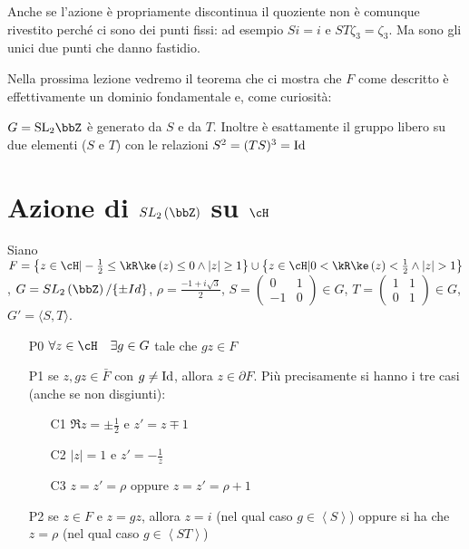 Anche se l'azione è propriamente discontinua il quoziente non è comunque
rivestito perché ci sono dei punti fissi: ad esempio $Si = i$ e $ST
\zeta_3 = \zeta_3$. Ma sono gli unici due punti che danno fastidio.


Nella prossima lezione vedremo il teorema che ci mostra che $F$ come
descritto è effettivamente un dominio fondamentale e, come curiosità:
\begin{teorema}
  $G = \SL_2 \bbZ$ è generato da $S$ e da $T$. Inoltre è esattamente il
  gruppo libero su due elementi ($S$ e $T$) con le relazioni
  $S^2 = (TS)^3 = \text{Id}$
\end{teorema}


\section{Azione di $SL_2 \left( \bbZ \right)$ su $\cH$}

Siano $F=\left\{z \in \cH | -\frac{1}{2} \leq \Re(z) \leq 0
\wedge |z| \geq 1 \right\} \cup
\left\{z \in \cH | 0 < \Re(z) < \frac{1}{2} \wedge |z| > 1 \right\}$,
$G=SL_2 \left( \bbZ \right)/\{\pm Id\}$,   $\rho=\frac{-1+i\sqrt{3}}{2}$,
$S=\left( \begin{array}{cc} 0 & 1 \\ -1 & 0 \end{array} \right) \in G$,
$T=\left( \begin{array}{cc} 1 & 1 \\ 0 & 1 \end{array} \right) \in G$,
$G' = \langle S, T \rangle$.

\begin{teorema}
\begin{itemize}
\item[P0] $\forall z \in \cH \quad \exists g \in G$ tale che $gz \in F$
\item[P1] se $z,gz \in \bar{F}$ con $g \neq \text{Id}$, allora $z \in \partial F$.
  Più precisamente si hanno i tre casi (anche se non disgiunti):
  \begin{enumerate}
  \item[C1] $\Re z = \pm \frac{1}{2}$ e $z' = z \mp 1$
  \item[C2] $|z| = 1$ e $z' = - \frac{1}{z}$
  \item[C3] $z = z' = \rho$ oppure $z = z' = \rho + 1$
  \end{enumerate}
\item[P2] se $z \in F$ e $z=gz$,
  allora $z=i$ (nel qual caso $g \in \left\langle S \right\rangle$) oppure si ha che
  $z= \rho$ (nel qual caso $g \in \left\langle ST \right\rangle$)
\end{itemize}
\end{teorema}

